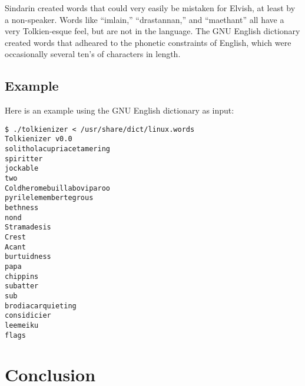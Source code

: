 \documentclass[10pt]{article}
\begin{document}
Sindarin created words that could very easily be mistaken for Elvish, at least
by a non-speaker. Words like ``imlain,'' ``drastannan,'' and ``maethant'' all
have a very Tolkien-esque feel, but are not in the language. The GNU English
dictionary created words that adheared to the phonetic constraints of English,
which were occasionally several ten's of characters in length.

\subsection{Example}

Here is an example using the GNU English dictionary as input:

\begin{verbatim}
$ ./tolkienizer < /usr/share/dict/linux.words
Tolkienizer v0.0
solitholacupriacetamering
spiritter
jockable
two
Coldheromebuillaboviparoo
pyrilelemembertegrous
bethness
nond
Stramadesis
Crest
Acant
burtuidness
papa
chippins
subatter
sub
brodiacarquieting
considicier
leemeiku
flags
\end{verbatim}

\section{Conclusion}

{}

\end{document}
